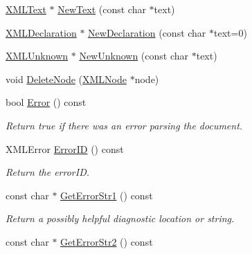 \begin{DoxyCompactItemize}
\item 
\hyperlink{classtinyxml2_1_1_x_m_l_text}{X\-M\-L\-Text} $\ast$ \hyperlink{classtinyxml2_1_1_x_m_l_document_a3e3424c6771a6634346d6544be6be494}{New\-Text} (const char $\ast$text)
\item 
\hyperlink{classtinyxml2_1_1_x_m_l_declaration}{X\-M\-L\-Declaration} $\ast$ \hyperlink{classtinyxml2_1_1_x_m_l_document_a6721d08fb23b12e99f5fa46810bff268}{New\-Declaration} (const char $\ast$text=0)
\item 
\hyperlink{classtinyxml2_1_1_x_m_l_unknown}{X\-M\-L\-Unknown} $\ast$ \hyperlink{classtinyxml2_1_1_x_m_l_document_a8545e590fc2682b08769f8030e8b1b57}{New\-Unknown} (const char $\ast$text)
\item 
void \hyperlink{classtinyxml2_1_1_x_m_l_document_a2202c6ce254083bf08abec3d36d2e8ac}{Delete\-Node} (\hyperlink{classtinyxml2_1_1_x_m_l_node}{X\-M\-L\-Node} $\ast$node)
\item 
\hypertarget{classtinyxml2_1_1_x_m_l_document_a7f351111b1715879a6029d189f7457e1}{bool \hyperlink{classtinyxml2_1_1_x_m_l_document_a7f351111b1715879a6029d189f7457e1}{Error} () const }\label{classtinyxml2_1_1_x_m_l_document_a7f351111b1715879a6029d189f7457e1}

\begin{DoxyCompactList}\small\item\em Return true if there was an error parsing the document. \end{DoxyCompactList}\item 
\hypertarget{classtinyxml2_1_1_x_m_l_document_af2a06d3470ce7d0bd562b54c15fcee3d}{X\-M\-L\-Error \hyperlink{classtinyxml2_1_1_x_m_l_document_af2a06d3470ce7d0bd562b54c15fcee3d}{Error\-I\-D} () const }\label{classtinyxml2_1_1_x_m_l_document_af2a06d3470ce7d0bd562b54c15fcee3d}

\begin{DoxyCompactList}\small\item\em Return the error\-I\-D. \end{DoxyCompactList}\item 
\hypertarget{classtinyxml2_1_1_x_m_l_document_ad88ff6becc50d319347f47c6e99373b8}{const char $\ast$ \hyperlink{classtinyxml2_1_1_x_m_l_document_ad88ff6becc50d319347f47c6e99373b8}{Get\-Error\-Str1} () const }\label{classtinyxml2_1_1_x_m_l_document_ad88ff6becc50d319347f47c6e99373b8}

\begin{DoxyCompactList}\small\item\em Return a possibly helpful diagnostic location or string. \end{DoxyCompactList}\item 
\hypertarget{classtinyxml2_1_1_x_m_l_document_aa608474d409beea9d7280ff7dc5807c1}{const char $\ast$ \hyperlink{classtinyxml2_1_1_x_m_l_document_aa608474d409beea9d7280ff7dc5807c1}{Get\-Error\-Str2} () const }\label{classtinyxml2_1_1_x_m_l_document_aa608474d409beea9d7280ff7dc5807c1}


\end{DoxyCompactItemize}
